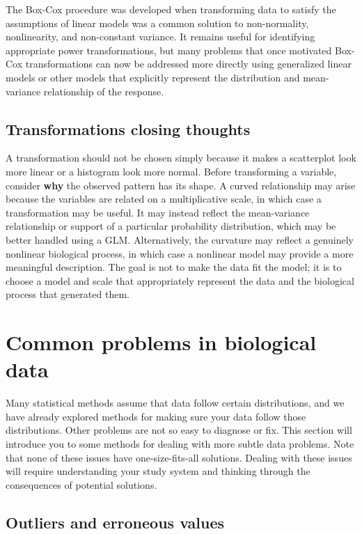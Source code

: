 \documentclass[
  13,
  letterpaper,
]{report}
\begin{document}
The Box-Cox procedure was developed when transforming data to satisfy
the assumptions of linear models was a common solution to non-normality,
nonlinearity, and non-constant variance. It remains useful for
identifying appropriate power transformations, but many problems that
once motivated Box-Cox transformations can now be addressed more
directly using generalized linear models or other models that explicitly
represent the distribution and mean-variance relationship of the
response.

\section{Transformations closing thoughts}\label{sec-trans-close}

A transformation should not be chosen simply because it makes a
scatterplot look more linear or a histogram look more normal. Before
transforming a variable, consider \textbf{why} the observed pattern has
its shape. A curved relationship may arise because the variables are
related on a multiplicative scale, in which case a transformation may be
useful. It may instead reflect the mean-variance relationship or support
of a particular probability distribution, which may be better handled
using a GLM. Alternatively, the curvature may reflect a genuinely
nonlinear biological process, in which case a nonlinear model may
provide a more meaningful description. The goal is not to make the data
fit the model; it is to choose a model and scale that appropriately
represent the data and the biological process that generated them.

\chapter{Common problems in biological data}\label{sec-problems}

Many statistical methods assume that data follow certain distributions,
and we have already explored methods for making sure your data follow
those distributions. Other problems are not so easy to diagnose or fix.
This section will introduce you to some methods for dealing with more
subtle data problems. Note that none of these issues have
one-size-fits-all solutions. Dealing with these issues will require
understanding your study system and thinking through the consequences of
potential solutions.

\section{Outliers and erroneous
values}\label{outliers-and-erroneous-values}
\end{document}
